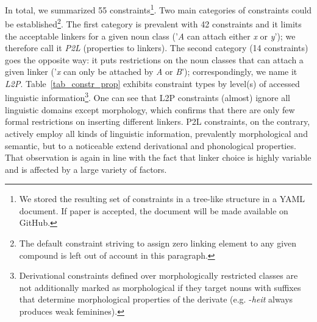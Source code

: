 \documentclass[10pt, a4paper]{article}
\begin{document}
In total, we summarized 55 constraints\footnote{We stored the resulting set of constraints in a tree-like structure in a YAML document. If paper is accepted, the document will be made available on GitHub.}. Two main categories of constraints could be established\footnote{The default constraint striving to assign zero linking element to any given compound is left out of account in this paragraph.}. The first category is prevalent with 42 constraints and it limits the acceptable linkers for a given noun class ('\textit{A} can attach either \textit{x} or \textit{y}'); we therefore call it \textit{P2L} (properties to linkers). The second category (14 constraints) goes the opposite way: it puts restrictions on the noun classes that can attach a given linker ('\textit{x} can only be attached by \textit{A} or \textit{B}'); correspondingly, we name it \textit{L2P}. Table~\ref{tab_constr_prop} exhibits constraint types by level(s) of accessed linguistic information\footnote{Derivational constraints defined over morphologically restricted classes are not additionally marked as morphological if they target nouns with suffixes that determine morphological properties of the derivate (e.g. -\textit{heit} always produces weak feminines).}. One can see that L2P constraints (almost) ignore all linguistic domains except morphology, which confirms that there are only few formal restrictions on inserting different linkers. P2L constraints, on the contrary, actively employ all kinds of linguistic information, prevalently morphological and semantic, but to a noticeable extend derivational and phonological properties. That observation is again in line with the fact that linker choice is highly variable and is affected by a large variety of factors.
\end{document}
